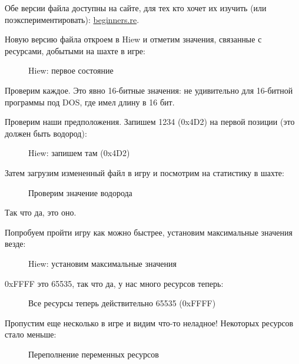 Обе версии файла доступны на сайте, для тех кто хочет их изучить (или поэкспериментировать): 
\href{http://go.yurichev.com/17212}{beginners.re}.

\clearpage
Новую версию файла откроем в Hiew и отметим значения, связанные с ресурсами, добытыми на шахте в игре: 

\begin{figure}[H]
\centering
{}
\caption{Hiew: первое состояние}
\label{fig:mill_hiew3}
\end{figure}

Проверим каждое.
Это явно 16-битные значения: не удивительно для 16-битной программы под DOS, где \Tint имел длину в 16 бит.

\clearpage
Проверим наши предположения.
Запишем 1234 (0x4D2) на первой позиции (это должен быть водород):

\begin{figure}[H]
\centering
{}
\caption{Hiew: запишем там (0x4D2)}
\label{fig:mill_hiew4}
\end{figure}

Затем загрузим измененный файл в игру и посмотрим на статистику в шахте:

\begin{figure}[H]
\centering
{}
\caption{Проверим значение водорода}
\label{fig:mill_5}
\end{figure}

Так что да, это оно.

\clearpage
Попробуем пройти игру как можно быстрее, установим максимальные значения везде:

\begin{figure}[H]
\centering
{}
\caption{Hiew: установим максимальные значения}
\label{fig:mill_hiew7}
\end{figure}

0xFFFF это 65535, так что да, у нас много ресурсов теперь:

\begin{figure}[H]
\centering
{}
\caption{Все ресурсы теперь действительно 65535 (0xFFFF)}
\label{fig:mill_6}
\end{figure}

\clearpage
Пропустим еще несколько  в игре и видим что-то неладное! 
Некоторых ресурсов стало меньше:

\begin{figure}[H]
\centering
{}
\caption{Переполнение переменных ресурсов}
\label{fig:mill_8}
\end{figure}

